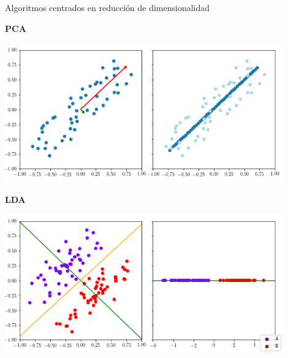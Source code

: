 \documentclass[10pt, compress]{beamer}
\begin{document}
\begin{frame}[shrink]{Algoritmos centrados en reducción de dimensionalidad}

\begin{minipage}[t][0.4\textheight]{0.45\textwidth}
  \begin{center}\textbf{PCA}\end{center}
  \begin{center}\includegraphics[width=0.9\textwidth]{images/pca1.png}\end{center}
\end{minipage}
\hfill
\begin{minipage}[t][0.4\textheight]{0.45\textwidth}
  \begin{center}\textbf{LDA}\end{center}
  \begin{center}\includegraphics[width=0.9\textwidth]{images/lda.png}\end{center}
  
\end{minipage}


\end{frame}
\end{document}
